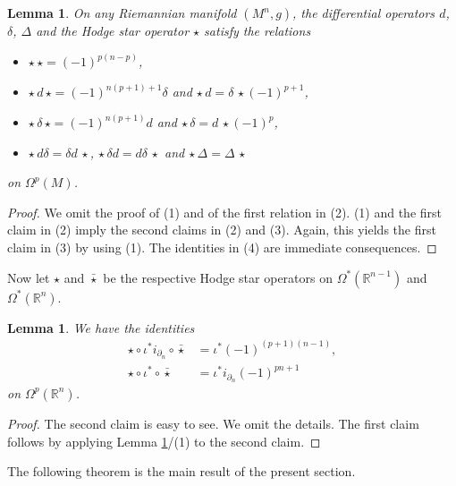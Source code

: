 \documentclass[a4paper,12pt,reqno]{amsart}
\newtheorem{lem}[theorem]{Lemma}
\numberwithin{theorem}{subsection}
\numberwithin{equation}{section}
\begin{document}
\begin{lem}\label{Hodge-gen} On any Riemannian manifold $(M^n,g)$, the differential
operators ${d}$, $\delta$, $\Delta$ and the Hodge star operator $\star$ satisfy
the relations
\begin{itemize}
\item [(1)] $\star \, \star = (-1)^{p(n-p)}$,
\item [(2)] $\star \, {d} \, \star = (-1)^{n(p+1)+1} \delta$ and $\star \, {d} = \delta \, \star (-1)^{p+1}$,
\item [(3)] $\star \, \delta \, \star = (-1)^{n(p+1)} {d}$ and $\star \, \delta = {d} \, \star (-1)^p $,
\item [(4)] $\star \, {d} \delta = \delta {d} \, \star$, $\star \, \delta {d} = {d}
\delta \, \star$ and $\star \, \Delta = \Delta \,\star$
\end{itemize}
on $\Omega^p(M)$.
\end{lem}

\begin{proof} We omit the proof of (1) and of the first relation in (2). (1) and the first
claim in (2) imply the second claims in (2) and (3). Again, this yields the
first claim in (3) by using (1). The identities in (4) are immediate
consequences.
\end{proof}

Now let $\star$ and $\bar{\star}$ be the respective Hodge star operators on
$\Omega^*({\mathbb{R}}^{n-1})$ and $\Omega^*({\mathbb{R}}^{n})$.

\begin{lem}\label{HodgeLemma} We have the identities
\begin{align*}
   \star \circ \iota^* i_{\partial_n} \circ\bar{\star} & = \iota^* (-1)^{(p+1)(n-1)}, \\
   \star \circ \iota^* \circ\bar{\star} & = \iota^* i_{\partial_n} (-1)^{pn+1}
\end{align*}
on $\Omega^p({\mathbb{R}}^n)$.
\end{lem}

\begin{proof} The second claim is easy to see. We omit the details. The first
claim follows by applying Lemma \ref{Hodge-gen}/(1) to the second claim.
\end{proof}

The following theorem is the main result of the present section.
\end{document}
